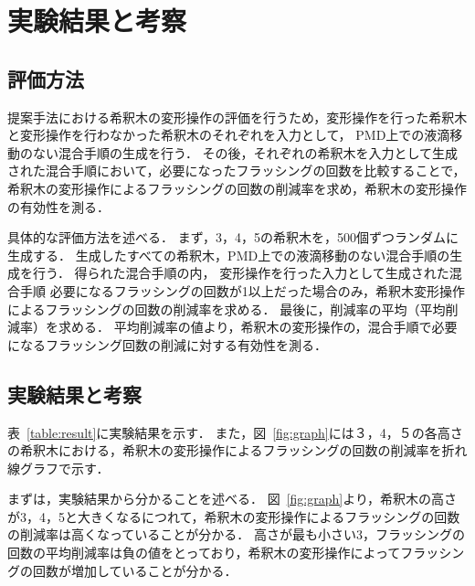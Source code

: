 \chapter{実験結果と考察}

\section{評価方法}
提案手法における希釈木の変形操作の評価を行うため，変形操作を行った希釈木と変形操作を行わなかった希釈木のそれぞれを入力として，
PMD上での液滴移動のない混合手順の生成を行う．
その後，それぞれの希釈木を入力として生成された混合手順において，必要になったフラッシングの回数を比較することで，
希釈木の変形操作によるフラッシングの回数の削減率を求め，希釈木の変形操作の有効性を測る．

具体的な評価方法を述べる．
まず，3，4，5の希釈木を，500個ずつランダムに生成する．
生成したすべての希釈木，PMD上での液滴移動のない混合手順の生成を行う．
得られた混合手順の内，
変形操作を行った入力として生成された混合手順
必要になるフラッシングの回数が1以上だった場合のみ，希釈木変形操作によるフラッシングの回数の削減率を求める．
最後に，削減率の平均（平均削減率）を求める．
平均削減率の値より，希釈木の変形操作の，混合手順で必要になるフラッシング回数の削減に対する有効性を測る．

\section{実験結果と考察}
表~\ref{table:result}に実験結果を示す．
また，図~\ref{fig:graph}には３，4，５の各高さの希釈木における，希釈木の変形操作によるフラッシングの回数の削減率を折れ線グラフで示す．

まずは，実験結果から分かることを述べる．
図~\ref{fig:graph}より，希釈木の高さが3，4，5と大きくなるにつれて，希釈木の変形操作によるフラッシングの回数の削減率は高くなっていることが分かる．
高さが最も小さい3，フラッシングの回数の平均削減率は負の値をとっており，希釈木の変形操作によってフラッシングの回数が増加していることが分かる．


